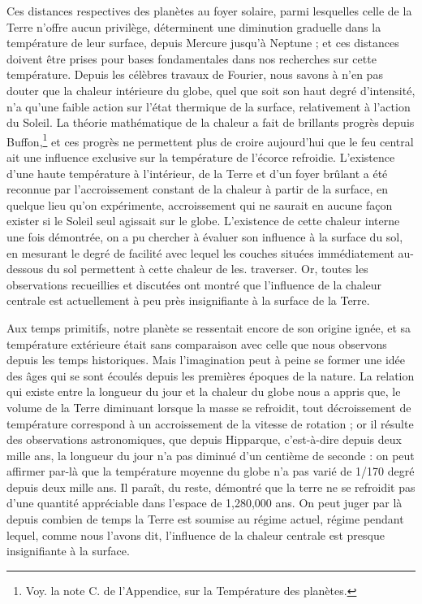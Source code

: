 \documentclass[a4paper, 11pt, oneside, landscape]{article}
\begin{document}
Ces distances respectives des planètes au foyer solaire, parmi lesquelles celle de la Terre n'offre aucun privilège, déterminent une diminution graduelle dans la température de leur surface, depuis Mercure jusqu'à Neptune ; et ces distances doivent être prises pour bases fondamentales dans nos recherches sur cette température. Depuis les célèbres travaux de Fourier, nous savons à n'en pas douter que la chaleur intérieure du globe, quel que soit son haut degré d'intensité, n'a qu'une faible action sur l'état thermique de la surface, relativement à l'action du Soleil. La théorie mathématique de la chaleur a fait de brillants progrès depuis Buffon,\footnote{Voy. la note C. de l'Appendice, sur la Température des planètes.} et ces progrès ne permettent plus de croire aujourd'hui que le feu central ait une influence exclusive sur la température de l'écorce refroidie. L'existence d'une haute température à l'intérieur, de la Terre et d'un foyer brûlant a été reconnue par l'accroissement constant de la chaleur à partir de la surface, en quelque lieu qu'on expérimente, accroissement qui ne saurait en aucune façon exister si le Soleil seul agissait sur le globe. L'existence de cette chaleur interne une fois démontrée, on a pu chercher à évaluer son influence à la surface du sol, en mesurant le degré de facilité avec lequel les couches situées immédiatement au-dessous du sol permettent à cette chaleur de les. traverser. Or, toutes les observations recueillies et discutées ont montré que l'influence de la chaleur centrale est actuellement à peu près insignifiante à la surface de la Terre.

Aux temps primitifs, notre planète se ressentait encore de son origine ignée, et sa température extérieure était sans comparaison avec celle que nous observons depuis les temps historiques. Mais l'imagination peut à peine se former une idée des âges qui se sont écoulés depuis les premières époques de la nature. La relation qui existe entre la longueur du jour et la chaleur du globe nous a appris que, le volume de la Terre diminuant lorsque la masse se refroidit, tout décroissement de température correspond à un accroissement de la vitesse de rotation ; or il résulte des observations astronomiques, que depuis Hipparque, c'est-à-dire depuis deux mille ans, la longueur du jour n'a pas diminué d'un centième de seconde :
on peut affirmer par-là que la température moyenne du globe n'a pas varié de 1/170 degré depuis deux mille ans. Il paraît, du reste, démontré que la terre ne se refroidit pas d'une quantité appréciable dans l'espace de 1,280,000 ans. On peut juger par là depuis combien de temps la Terre est soumise au régime actuel, régime pendant lequel, comme nous l'avons dit, l'influence de la chaleur centrale est presque insignifiante à la surface.
\end{document}
